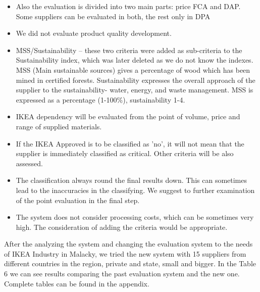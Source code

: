 \documentclass[oneside,12pt]{article}%
\begin{document}
\begin{itemize}
    \item Also the evaluation is divided into two main parts: price FCA and DAP. Some suppliers can be evaluated in both, the rest only in DPA
    \item We did not evaluate product quality development.
    \item MSS/Sustainability – these two criteria were added as sub-criteria to the Sustainability index, which was later deleted as we do not know the indexes. MSS (Main sustainable sources) gives a percentage of wood which has been mined in certified forests. Sustainability expresses the overall approach of the supplier to the sustainability- water, energy, and waste management. MSS is expressed as a percentage (1-100\%), sustainability 1-4.
  \item IKEA dependency will be evaluated from the point of volume, price and range of supplied materials.
  \item If the IKEA Approved is to be classified as 'no', it will not mean that the supplier is immediately classified as critical. Other criteria will be also assessed.
  \item The classification always round the final results down. This can sometimes lead to the inaccuracies in the classifying. We suggest to further examination of the point evaluation in the final step.
  \item The system does not consider processing costs, which can be sometimes very high. The consideration of adding the criteria would be appropriate.

\end{itemize}


After the analyzing the system and changing the evaluation system to the needs of IKEA Industry in Malacky, we tried the new system with 15 suppliers from different countries in the region, private and state, small and bigger. In the Table 6 we can see results comparing the past evaluation system and the new one. Complete tables can be found in the appendix. \par
\end{document}
